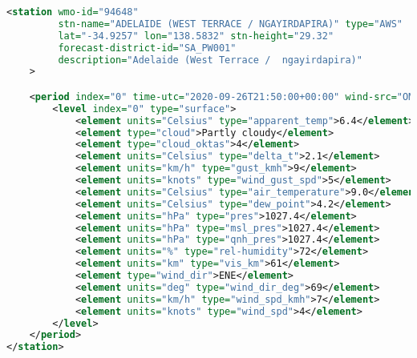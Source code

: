 \documentclass[11pt,a4paper,titlepage]{extarticle}
\begin{document}
\begin{lstlisting}[language=XML]
<station wmo-id="94648"
         stn-name="ADELAIDE (WEST TERRACE / NGAYIRDAPIRA)" type="AWS"
         lat="-34.9257" lon="138.5832" stn-height="29.32"
         forecast-district-id="SA_PW001"
         description="Adelaide (West Terrace /  ngayirdapira)"
    >

    <period index="0" time-utc="2020-09-26T21:50:00+00:00" wind-src="OMD">
        <level index="0" type="surface">
            <element units="Celsius" type="apparent_temp">6.4</element>
            <element type="cloud">Partly cloudy</element>
            <element type="cloud_oktas">4</element>
            <element units="Celsius" type="delta_t">2.1</element>
            <element units="km/h" type="gust_kmh">9</element>
            <element units="knots" type="wind_gust_spd">5</element>
            <element units="Celsius" type="air_temperature">9.0</element>
            <element units="Celsius" type="dew_point">4.2</element>
            <element units="hPa" type="pres">1027.4</element>
            <element units="hPa" type="msl_pres">1027.4</element>
            <element units="hPa" type="qnh_pres">1027.4</element>
            <element units="%" type="rel-humidity">72</element>
            <element units="km" type="vis_km">61</element>
            <element type="wind_dir">ENE</element>
            <element units="deg" type="wind_dir_deg">69</element>
            <element units="km/h" type="wind_spd_kmh">7</element>
            <element units="knots" type="wind_spd">4</element>
        </level>
    </period>
</station>
\end{lstlisting}
\end{document}
